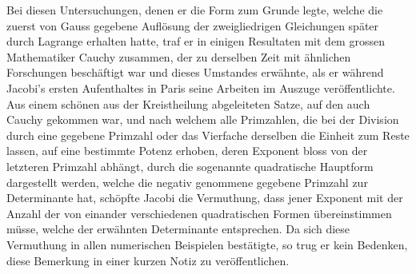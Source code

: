\documentclass[11pt]{article}
\begin{document}
Bei diesen Untersuchungen, denen er die Form zum Grunde legte, welche die zuerst von Gauss gegebene Auflösung der zweigliedrigen Gleichungen später durch Lagrange erhalten hatte, traf er in einigen Resultaten mit dem grossen Mathematiker Cauchy zusammen, der zu derselben Zeit mit ähnlichen Forschungen beschäftigt war und dieses Umstandes erwähnte, als er während Jacobi’s ersten Aufenthaltes in Paris seine Arbeiten im Auszuge veröffentlichte. Aus einem schönen aus der Kreistheilung abgeleiteten Satze, auf den auch Cauchy gekommen war, und nach welchem alle Primzahlen, die bei der Division durch eine gegebene Primzahl oder das Vierfache derselben die Einheit zum Reste lassen, auf eine bestimmte Potenz erhoben, deren Exponent bloss von der letzteren Primzahl abhängt, durch die sogenannte quadratische Hauptform dargestellt werden, welche die negativ genommene gegebene Primzahl zur Determinante hat, schöpfte Jacobi die Vermuthung, dass jener Exponent mit der Anzahl der von einander verschiedenen quadratischen Formen übereinstimmen müsse, welche der erwähnten Determinante entsprechen. Da sich diese Vermuthung in allen numerischen Beispielen bestätigte, so trug er kein Bedenken, diese Bemerkung in einer kurzen Notiz zu veröffentlichen.
\end{document}
